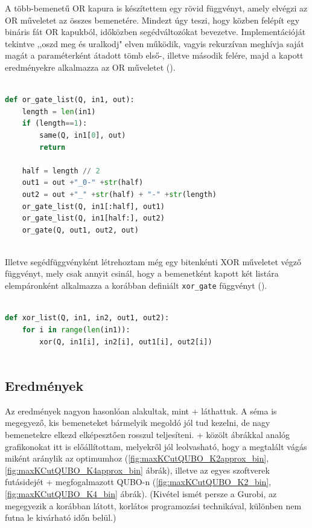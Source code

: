 A több-bemenetű OR kapura is készítettem egy rövid függvényt, amely elvégzi az OR műveletet az összes bemenetére. Mindezt úgy teszi, hogy közben felépít egy bináris fát OR kapukból, időközben segédváltozókat bevezetve. Implementációját tekintve ,,oszd meg és uralkodj" elven működik, vagyis rekurzívan meghívja saját magát a paraméterként átadott tömb első-, illetve második felére, majd a kapott eredményekre alkalmazza az OR műveletet ().

\begin{lstlisting}[language=python,caption=Sokbemenetes OR kapu,label=code:MultipleOrGates]
	
def or_gate_list(Q, in1, out):
	length = len(in1)
	if (length==1):
		same(Q, in1[0], out)
		return
	
	half = length // 2
	out1 = out +"_0-" +str(half)  
	out2 = out +"_" +str(half) + "-" +str(length)
	or_gate_list(Q, in1[:half], out1)
	or_gate_list(Q, in1[half:], out2)
	or_gate(Q, out1, out2, out)
	
\end{lstlisting}

Illetve segédfüggvényként létrehoztam még egy bitenkénti XOR műveletet végző függvényt, mely csak annyit csinál, hogy a bemenetként kapott két listára elempáronként alkalmazza a korábban definiált \verb+xor_gate+ függvényt ().

\begin{lstlisting}[language=python,caption=Bitenkénti XOR művelet,label=code:XorGateList]
	
def xor_list(Q, in1, in2, out1, out2):
	for i in range(len(in1)):
		xor(Q, in1[i], in2[i], out1[i], out2[i])
	
\end{lstlisting}

\subsection{Eredmények}

Az eredmények nagyon hasonlóan alakultak, mint \az+ láthattuk. A séma is megegyező, kis bemeneteket bármelyik megoldó jól tud kezelni, de nagy bemenetekre elkezd elképesztően rosszul teljesíteni. \Az+ közölt ábrákkal analóg grafikonokat itt is előállítottam, melyekről jól leolvasható, hogy a megtalált vágás miként aránylik az optimumhoz (\ref{fig:maxKCutQUBO_K2approx_bin}, \ref{fig:maxKCutQUBO_K4approx_bin} ábrák), illetve az egyes szoftverek futásidejét \az+ megfogalmazott QUBO-n (\ref{fig:maxKCutQUBO_K2_bin}, \ref{fig:maxKCutQUBO_K4_bin} ábrák). (Kivétel ismét persze a Gurobi, az megegyezik a korábban látott, korlátos programozási technikával, különben nem futna le kivárható időn belül.)

